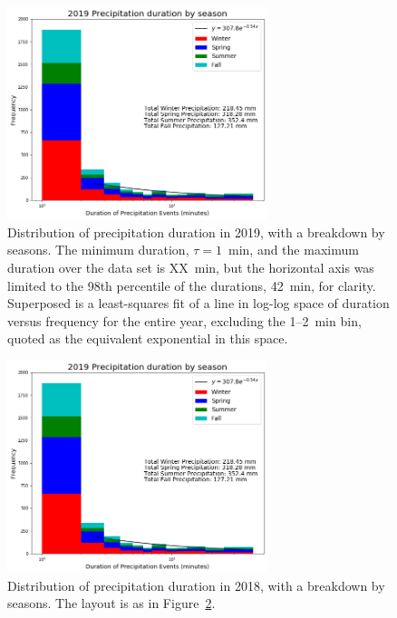 \documentclass[11pt]{report}
\begin{document}
\begin{figure}[t]
  \centering
  \includegraphics[width=0.675\textwidth]{Figures/More_detail_precip_2019.png}
  \caption[Precipitation histogram for 2019 broken down by season]{\label{p2019}
    Distribution of precipitation duration in 2019, with a breakdown
    by seasons. The minimum duration, $\tau=1$~min, and the maximum
    duration over the data set is XX~min, but the horizontal axis was
    limited to the 98th percentile of the durations, 42~min, for
    clarity. Superposed is a least-squares fit of a line in log-log
    space of duration versus frequency for the entire year, excluding
    the 1--2~min bin, quoted as the equivalent exponential in this
    space.}
\end{figure}
\begin{figure}[b]
  \centering
  \includegraphics[width=0.675\textwidth]{Figures/More_detail_precip_2019.png}
  \caption[Precipitation histogram for 2018 broken down by season]{\label{p2019}
    Distribution of precipitation duration in 2018, with a breakdown
    by seasons. The layout is as in Figure~\ref{p2019}.}
\end{figure}
\end{document}
